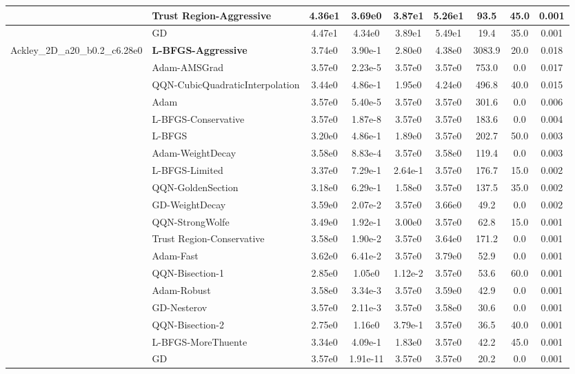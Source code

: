 \documentclass[10pt]{article}
\begin{document}
\begin{longtable}{|l|l|c|c|c|c|c|c|c|}
\hline
 & Trust Region-Aggressive & 4.36e1 & 3.69e0 & 3.87e1 & 5.26e1 & 93.5 & 45.0 & 0.001 \\
\hline
 & GD & 4.47e1 & 4.34e0 & 3.89e1 & 5.49e1 & 19.4 & 35.0 & 0.001 \\
Ackley\_2D\_a20\_b0.2\_c6.28e0 & \textbf{L-BFGS-Aggressive} & 3.74e0 & 3.90e-1 & 2.80e0 & 4.38e0 & 3083.9 & 20.0 & 0.018 \\
\hline
 & Adam-AMSGrad & 3.57e0 & 2.23e-5 & 3.57e0 & 3.57e0 & 753.0 & 0.0 & 0.017 \\
\hline
 & QQN-CubicQuadraticInterpolation & 3.44e0 & 4.86e-1 & 1.95e0 & 4.24e0 & 496.8 & 40.0 & 0.015 \\
\hline
 & Adam & 3.57e0 & 5.40e-5 & 3.57e0 & 3.57e0 & 301.6 & 0.0 & 0.006 \\
\hline
 & L-BFGS-Conservative & 3.57e0 & 1.87e-8 & 3.57e0 & 3.57e0 & 183.6 & 0.0 & 0.004 \\
\hline
 & L-BFGS & 3.20e0 & 4.86e-1 & 1.89e0 & 3.57e0 & 202.7 & 50.0 & 0.003 \\
\hline
 & Adam-WeightDecay & 3.58e0 & 8.83e-4 & 3.57e0 & 3.58e0 & 119.4 & 0.0 & 0.003 \\
\hline
 & L-BFGS-Limited & 3.37e0 & 7.29e-1 & 2.64e-1 & 3.57e0 & 176.7 & 15.0 & 0.002 \\
\hline
 & QQN-GoldenSection & 3.18e0 & 6.29e-1 & 1.58e0 & 3.57e0 & 137.5 & 35.0 & 0.002 \\
\hline
 & GD-WeightDecay & 3.59e0 & 2.07e-2 & 3.57e0 & 3.66e0 & 49.2 & 0.0 & 0.002 \\
\hline
 & QQN-StrongWolfe & 3.49e0 & 1.92e-1 & 3.00e0 & 3.57e0 & 62.8 & 15.0 & 0.001 \\
\hline
 & Trust Region-Conservative & 3.58e0 & 1.90e-2 & 3.57e0 & 3.64e0 & 171.2 & 0.0 & 0.001 \\
\hline
 & Adam-Fast & 3.62e0 & 6.41e-2 & 3.57e0 & 3.79e0 & 52.9 & 0.0 & 0.001 \\
\hline
 & QQN-Bisection-1 & 2.85e0 & 1.05e0 & 1.12e-2 & 3.57e0 & 53.6 & 60.0 & 0.001 \\
\hline
 & Adam-Robust & 3.58e0 & 3.34e-3 & 3.57e0 & 3.59e0 & 42.9 & 0.0 & 0.001 \\
\hline
 & GD-Nesterov & 3.57e0 & 2.11e-3 & 3.57e0 & 3.58e0 & 30.6 & 0.0 & 0.001 \\
\hline
 & QQN-Bisection-2 & 2.75e0 & 1.16e0 & 3.79e-1 & 3.57e0 & 36.5 & 40.0 & 0.001 \\
\hline
 & L-BFGS-MoreThuente & 3.34e0 & 4.09e-1 & 1.83e0 & 3.57e0 & 42.2 & 45.0 & 0.001 \\
\hline
 & GD & 3.57e0 & 1.91e-11 & 3.57e0 & 3.57e0 & 20.2 & 0.0 & 0.001 \\

\end{longtable}
\end{document}
